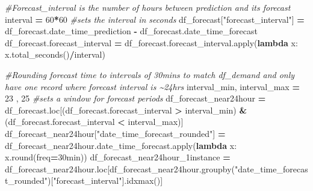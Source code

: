 \documentclass[mstat,12pt,a4paper]{unswthesis}
\newenvironment{Shaded}{\begin{snugshade}}{\end{snugshade}}
\newcommand{\BuiltInTok}[1]{#1}
\newcommand{\CommentTok}[1]{\textcolor[rgb]{0.56,0.35,0.01}{\textit{#1}}}
\newcommand{\DecValTok}[1]{\textcolor[rgb]{0.00,0.00,0.81}{#1}}
\newcommand{\KeywordTok}[1]{\textcolor[rgb]{0.13,0.29,0.53}{\textbf{#1}}}
\newcommand{\NormalTok}[1]{#1}
\newcommand{\OperatorTok}[1]{\textcolor[rgb]{0.81,0.36,0.00}{\textbf{#1}}}
\newcommand{\StringTok}[1]{\textcolor[rgb]{0.31,0.60,0.02}{#1}}
\begin{document}
\begin{Shaded}
\begin{Highlighting}[]

\CommentTok{\#Forecast\_interval is the number of hours between prediction and it\textquotesingle{}s forecast}
\NormalTok{interval }\OperatorTok{=} \DecValTok{60}\OperatorTok{*}\DecValTok{60} \CommentTok{\#sets the interval in seconds}
\NormalTok{df\_forecast[}\StringTok{"forecast\_interval"}\NormalTok{] }\OperatorTok{=}\NormalTok{ df\_forecast.date\_time\_prediction }\OperatorTok{{-}}\NormalTok{ df\_forecast.date\_time\_forecast}
\NormalTok{df\_forecast.forecast\_interval }\OperatorTok{=}\NormalTok{ df\_forecast.forecast\_interval.}\BuiltInTok{apply}\NormalTok{(}\KeywordTok{lambda}\NormalTok{ x: x.total\_seconds()}\OperatorTok{/}\NormalTok{interval)}

\CommentTok{\#Rounding forecast time to intervals of 30mins to match df\_demand and only have one record where forecast interval is \textasciitilde{}24hrs}
\NormalTok{interval\_min, interval\_max }\OperatorTok{=} \DecValTok{23}\NormalTok{ , }\DecValTok{25} \CommentTok{\#sets a window for forecast periods}
\NormalTok{df\_forecast\_near24hour }\OperatorTok{=}\NormalTok{ df\_forecast.loc[(df\_forecast.forecast\_interval }\OperatorTok{\textgreater{}}\NormalTok{ interval\_min) }\OperatorTok{\&}\NormalTok{ (df\_forecast.forecast\_interval }\OperatorTok{\textless{}}\NormalTok{ interval\_max)]}
\NormalTok{df\_forecast\_near24hour[}\StringTok{"date\_time\_forecast\_rounded"}\NormalTok{] }\OperatorTok{=}\NormalTok{ df\_forecast\_near24hour.date\_time\_forecast.}\BuiltInTok{apply}\NormalTok{(}\KeywordTok{lambda}\NormalTok{ x: x.}\BuiltInTok{round}\NormalTok{(freq}\OperatorTok{=}\StringTok{\textquotesingle{}30min\textquotesingle{}}\NormalTok{))}
\NormalTok{df\_forecast\_near24hour\_1instance }\OperatorTok{=}\NormalTok{ df\_forecast\_near24hour.loc[df\_forecast\_near24hour.groupby(}\StringTok{"date\_time\_forecast\_rounded"}\NormalTok{)[}\StringTok{"forecast\_interval"}\NormalTok{].idxmax()]}


\end{Highlighting}
\end{Shaded}
\end{document}
